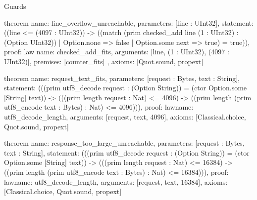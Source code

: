 \begin{lexlean}{Guards}
\begin{semanticmodule}
theorem{
  name: line_overflow_unreachable,
  parameters: [line : UInt32],
  statement: ((line <= (4097 : UInt32)) -> ((match (prim checked_add line (1 : UInt32) : (Option UInt32))
    | Option.none => false
    | Option.some next => true) = true)),
  proof: law{
    name: checked_add_fits,
    arguments: [line, (1 : UInt32), (4097 : UInt32)],
    premises: [counter_fits]
  },
  axioms: [Quot.sound, propext]
}

theorem{
  name: request_text_fits,
  parameters: [request : Bytes, text : String],
  statement: (((prim utf8_decode request : (Option String)) = (ctor Option.some [String] text)) -> (((prim length request : Nat) <= 4096) -> ((prim length (prim utf8_encode text : Bytes) : Nat) <= 4096))),
  proof: law{name: utf8_decode_length, arguments: [request, text, 4096]},
  axioms: [Classical.choice, Quot.sound, propext]
}

theorem{
  name: response_too_large_unreachable,
  parameters: [request : Bytes, text : String],
  statement: (((prim utf8_decode request : (Option String)) = (ctor Option.some [String] text)) -> (((prim length request : Nat) <= 16384) -> ((prim length (prim utf8_encode text : Bytes) : Nat) <= 16384))),
  proof: law{name: utf8_decode_length, arguments: [request, text, 16384]},
  axioms: [Classical.choice, Quot.sound, propext]
}
\end{semanticmodule}
\end{lexlean}

